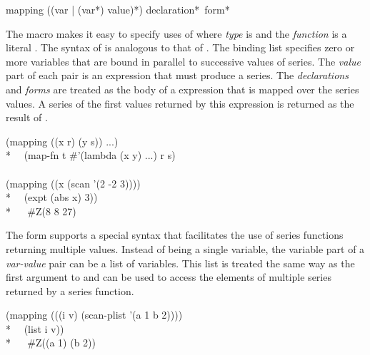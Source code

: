 \begin{defmac}
mapping ({({var | ({var}*)} value)}*) {declaration}* {\,form}*

The macro  makes it easy to specify uses of 
where \emph{type} is  and the \emph{function} is a literal 
.  The syntax of  is analogous to that of .
The binding list specifies zero or more variables that are bound in parallel to
successive values of series.  The \emph{value} part of each pair is
an expression that must produce a
series.  The \emph{declarations} and \emph{forms} are
treated as the body of a  expression
that is mapped over the series values.  A series of the first values
returned by this  expression is returned as the result of 
.
\begin{lisp}
(mapping ((x r) (y s)) ...) {\EQ} \\*
~~(map-fn t \#'(lambda (x y) ...) r s) \\
\\
(mapping ((x (scan '(2 -2 3)))) \\*
~~(expt (abs x) 3)) \\*
~~{\EV} \#Z(8 8 27)
\end{lisp}

The form  supports a special syntax that facilitates the
use of series functions returning multiple values.  Instead of being
a single variable, the variable part of a \emph{var-value} pair can be a list of
variables.  This list is treated the same way as the first argument to
 and can be used to access the elements of
multiple series returned by a series function.
\begin{lisp}
(mapping (((i v) (scan-plist '(a 1 b 2)))) \\*
~~(list i v)) \\*
~~{\EV} \#Z((a 1) (b 2))
\end{lisp}
\end{defmac}

